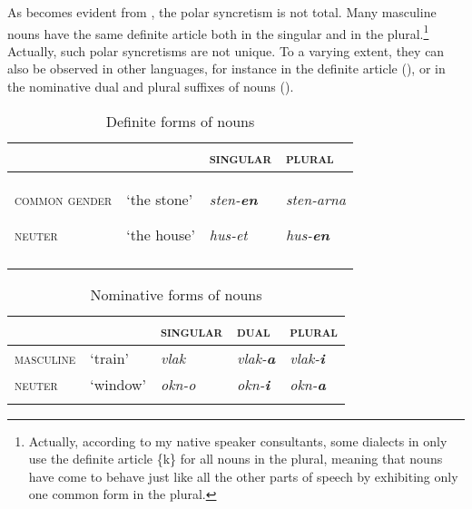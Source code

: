 \documentclass[output=paper]{langsci/langscibook}
\begin{document}
\newpage 
As becomes evident from , the polar syncretism is not total. Many masculine nouns have the same definite article both in the singular and in the plural.\footnote{Actually, according to my native speaker consultants, some  dialects in  only use the definite article \{k\} for all nouns in the plural, meaning that nouns have come to behave just like all the other parts of speech by exhibiting only one common form in the plural.} Actually, such polar syncretisms are not unique. To a varying extent, they can also be observed in other languages, for instance in the  definite article (), or in the nominative dual and plural suffixes of  nouns ().
 
\begin{table}
\caption{Definite forms of  nouns}
\label{tab:nilsson:7}

\begin{tabularx}{\textwidth}{XXXX}
\lsptoprule
& & {\textsc{singular}} & {\textsc{plural}} \\
\midrule
{\textsc{common gender}}

{\textsc{neuter}} & {‘the stone’}

{‘the house’} & {\textit{sten-}\textbf{\textit{en}}}

{\textit{hus-et}} &  {\textit{sten-arna}}

{\textit{hus-}\textbf{\textit{en}}} \\
\lspbottomrule
\end{tabularx}

\end{table} 

 
\begin{table}
\caption{Nominative forms of  nouns}
\label{tab:nilsson:8}
\begin{tabularx}{\textwidth}{XXXXX}
\lsptoprule
& & {\textsc{singular}} &  {\textsc{dual}} & {\textsc{plural}} \\
\midrule
{\textsc{masculine}} & {‘train’} & {\textit{vlak}} & {\textit{vlak-}\textbf{\textit{a}}} & {\textit{vlak-}\textbf{\textit{i}}} \\

{\textsc{neuter}} & {‘window’} & {\textit{okn-o}} & {\textit{okn-}\textbf{\textit{i}}} & {\textit{okn-}\textbf{\textit{a}}} \\
\lspbottomrule
\end{tabularx}

\end{table} 
\end{document}
